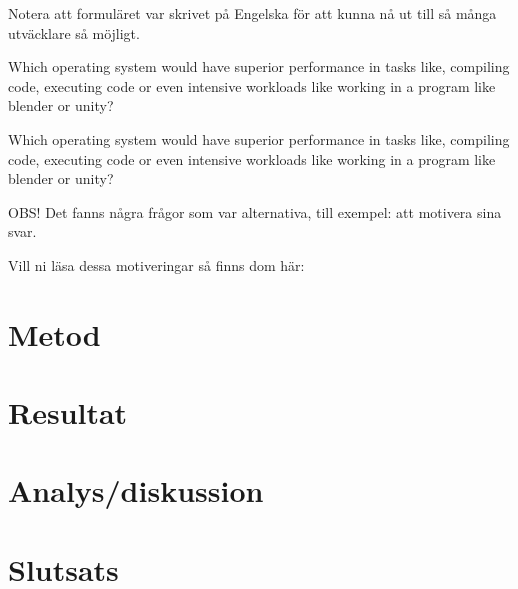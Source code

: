 \documentclass[a4paper, 12pt]{report}
\begin{document}
    Notera att formuläret var skrivet på Engelska för att kunna nå ut till så många utväcklare så möjligt.


    \vspace{8.7cm}


    \large {Which operating system would have superior performance in tasks like, compiling code, executing code or even intensive workloads like working in a program  like blender or unity?}

    \vspace{.6cm}

    \cite{form}
    \vspace{.2cm}

    \large {Which operating system would have superior performance in tasks like, compiling code, executing code or even intensive workloads like working in a program  like blender or unity?}

    \vspace{.5cm}



    \cite{form}

    \vspace{1cm}


    \small{OBS! Det fanns några frågor som var alternativa, till exempel: att motivera sina svar.
    
    Vill ni läsa dessa motiveringar så finns dom här:} 


\section{Metod}



\section{Resultat}

\section{Analys/diskussion}



\section{Slutsats}


\printbibliography
\end{document}
